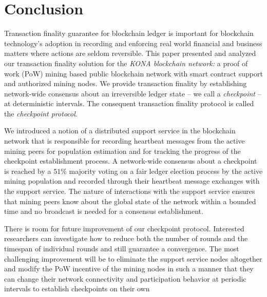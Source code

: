 \documentclass[conference]{IEEEtran}
\begin{document}




    



    
        




\section{Conclusion}
\label{s-conclusion}
Transaction finality guarantee for blockchain ledger is important for blockchain technology's adoption in recording and enforcing real world financial and business matters where actions are seldom reversible. This paper presented and analyzed our transaction finality solution for the \textit{KONA blockchain network:} a proof of work (PoW) mining based public blockchain network with smart contract support and authorized mining nodes. We provide transaction finality by establishing network-wide consensus about an irreversible ledger state -- we call a \textit{checkpoint} -- at deterministic intervals. The consequent transaction finality protocol is called the \textit{checkpoint protocol}.   

We introduced a notion of a distributed support service in the blockchain network that is responsible for recording heartbeat messages from the active mining peers for population estimation and for tracking the progress of the checkpoint establishment process. A network-wide consensus about a checkpoint is reached by a $51\%$ majority voting on a fair ledger election process by the active mining population and recorded through their heartbeat message exchanges with the support service. The nature of interactions with the support service ensures that mining peers know about the global state of the network within a bounded time and no broadcast is needed for a consensus establishment. 

There is room for future improvement of our checkpoint protocol. Interested researchers can investigate how to reduce both the number of rounds and the timespan of individual rounds and still guarantee a convergence. The most challenging improvement will be to eliminate the support service nodes altogether and modify the PoW incentive of the mining nodes in such a manner that they can change their network connectivity and participation behavior at periodic intervals to establish checkpoints on their own   
  



\end{document}

